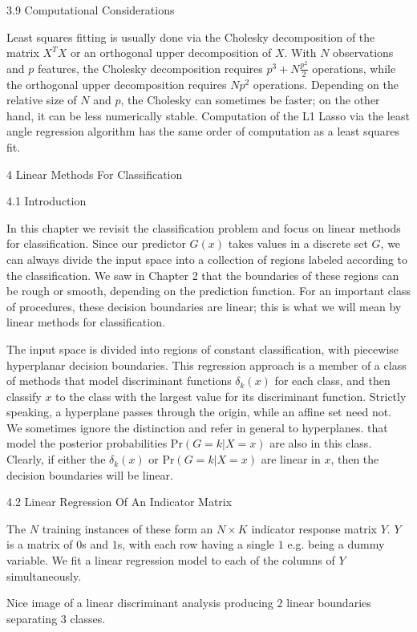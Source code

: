 3.9 Computational Considerations

Least squares fitting is usually done via the Cholesky decomposition of the matrix $X^T X$ or an orthogonal upper decomposition of $X$. With $N$ observations and $p$ features, the Cholesky decomposition requires $p^3+N \frac{p^2}{2}$ operations, while the orthogonal upper decomposition requires $N p^2$ operations. Depending on the relative size of $N$ and $p$, the Cholesky can sometimes be faster; on the other hand, it can be less numerically stable. Computation of the L1 Lasso via the least angle regression algorithm has the same order of computation as a least squares fit.

4 Linear Methods For Classification

4.1 Introduction

In this chapter we revisit the classification problem and focus on linear methods for classification. Since our predictor $G(x)$ takes values in a discrete set $G$, we can always divide the input space into a collection of regions labeled according to the classification. We saw in Chapter 2 that the boundaries of these regions can be rough or smooth, depending on the prediction function. For an important class of procedures, these decision boundaries are linear; this is what we will mean by linear methods for classification.

The input space is divided into regions of constant classification, with piecewise hyperplanar decision boundaries. This regression approach is a member of a class of methods that model discriminant functions $\delta_k (x)$ for each class, and then classify $x$ to the class with the largest value for its discriminant function. Strictly speaking, a hyperplane passes through the origin, while an affine set need not. We sometimes ignore the distinction and refer in general to hyperplanes. that model the posterior probabilities $\text{Pr}(G = k|X = x)$ are also in this class. Clearly, if either the $\delta_k (x)$ or $\text{Pr}(G = k|X = x)$ are linear in $x$, then the decision boundaries will be linear.

4.2 Linear Regression Of An Indicator Matrix

The $N$ training instances of these form an $N \times K$ indicator response matrix $Y$. $Y$ is a matrix of $0$s and $1$s, with each row having a single $1$ e.g. being a dummy variable. We fit a linear regression model to each of the columns of $Y$ simultaneously.

Nice image of a linear discriminant analysis producing $2$ linear boundaries separating $3$ classes.

